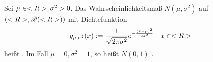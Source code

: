 \begin{definition}
	Sei $\mu \in <R>, \sigma^2 > 0$. Das Wahrscheinlichkeitsmaß $N(\mu, \sigma^2)$ auf $(<R>, \mathscr{B}(<R>))$ mit Dichtefunktion
	\begin{align*}
		g_{\mu,\sigma^2}(x) := \frac{1}{\sqrt{2\pi\sigma^2}}e^{-\frac{(x-\mu)^2}{2\sigma^2}} \quad x \in <R>
	\end{align*}
	heißt .
	Im Fall $\mu = 0,\sigma^2 = 1$, so heißt $N(0,1)$ .
\end{definition}